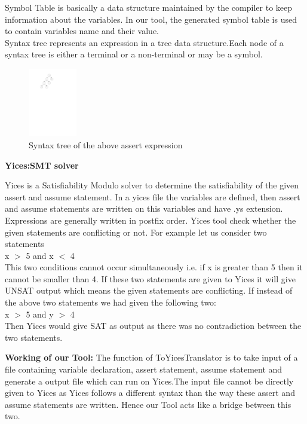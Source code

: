 \documentclass{svmult}
\begin{document}
Symbol Table is basically a data structure maintained by the compiler to keep information
about the variables. In our tool, the generated symbol table is used to contain variables 
name and their value.\\

Syntax tree represents an expression in a tree data structure.Each node of a syntax tree 
is either a terminal or a non-terminal or may be a symbol.\\
                 
                 
\begin{figure}[!h]
\centering
\includegraphics[height=3cm]{syntax_.pdf}
\caption{Syntax tree of the above assert expression} \label{fig1}
\end{figure}



\noindent
{\bf Yices:SMT solver} 

Yices is a Satisfiability Modulo solver to determine the satisfiability of the given assert 
and assume statement. In a yices file the variables are defined, then assert and assume statements
are written on this variables and have .ys extension. Expressions are generally written in postfix
order. Yices tool check whether the given statements are conflicting or not.
For example let us consider two statements\\

x $>$ 5 and x $<$ 4\\

This two conditions cannot occur simultaneously i.e. if x is greater than 5 
then it cannot be smaller than 4. If these two statements are given to Yices
it will give UNSAT output which means the given statements are conflicting.
If instead of the above two statements we had given the following two:\\

x $>$ 5 and y $>$ 4\\

Then Yices would give SAT as output as there was no contradiction between the two
statements. 

\noindent
{\bf Working of our Tool:} The function of ToYicesTranslator is to take 
input of a file containing variable declaration, assert statement, assume 
statement and generate a output file which can run on Yices.The input file
cannot be directly given to Yices as Yices follows a different syntax than
the way these assert and assume statements are written. Hence our Tool acts 
like a bridge between this two. \\
\end{document}

